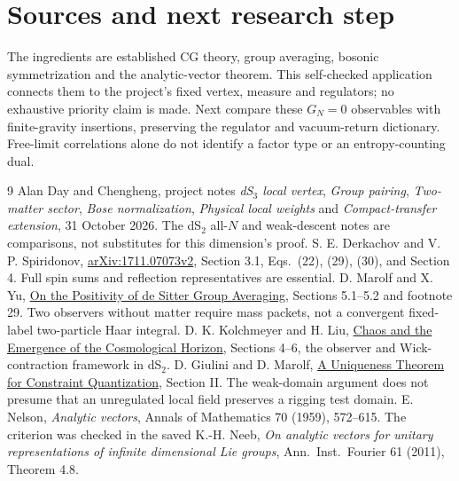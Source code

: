 \documentclass[11pt,a4paper]{article}
\begin{document}
\newpage
\section*{Sources and next research step}
The ingredients are established CG theory, group averaging,
bosonic symmetrization and the analytic-vector theorem.
This self-checked application connects them to the project's fixed
vertex, measure and regulators; no exhaustive priority claim is made.
Next compare these $G_N=0$ observables with finite-gravity insertions,
preserving the regulator and vacuum-return dictionary.
Free-limit correlations alone do not identify a factor type or
an entropy-counting dual.

\begin{thebibliography}{9}
 Alan Day and Chengheng, project notes
\emph{dS$_3$ local vertex}, \emph{Group pairing},
\emph{Two-matter sector}, \emph{Bose normalization},
\emph{Physical local weights} and \emph{Compact-transfer extension},
31 October 2026. The dS$_2$ all-$N$ and weak-descent notes are
comparisons, not substitutes for this dimension's proof.
 S. E. Derkachov and V. P. Spiridonov,
\href{https://arxiv.org/html/1711.07073v2}{arXiv:1711.07073v2},
Section 3.1, Eqs.\ (22), (29), (30), and Section 4.
Full spin sums and reflection representatives are essential.
 D. Marolf and X. Yu,
\href{https://arxiv.org/html/2610.24073v1}
{On the Positivity of de Sitter Group Averaging},
Sections 5.1--5.2 and footnote 29.
Two observers without matter require mass packets, not a convergent
fixed-label two-particle Haar integral.
 D. K. Kolchmeyer and H. Liu,
\href{https://arxiv.org/html/2411.08090v1}
{Chaos and the Emergence of the Cosmological Horizon},
Sections 4--6, the observer and Wick-contraction framework in dS$_2$.
 D. Giulini and D. Marolf,
\href{https://arxiv.org/html/gr-qc/9902045v2}
{A Uniqueness Theorem for Constraint Quantization},
Section II. The weak-domain argument does not presume that an
unregulated local field preserves a rigging test domain.
 E. Nelson, \emph{Analytic vectors},
Annals of Mathematics 70 (1959), 572--615.
The criterion was checked in the saved K.-H. Neeb,
\emph{On analytic vectors for unitary representations of infinite
dimensional Lie groups}, Ann.\ Inst.\ Fourier 61 (2011), Theorem 4.8.
\end{thebibliography}
\end{document}
